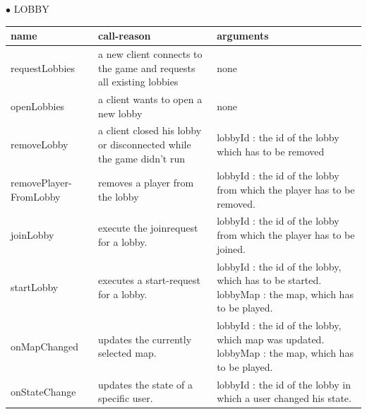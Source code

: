 \documentclass{scrartcl}
\newcommand{\n}{\newline}
\begin{document}
\newpage
$\bullet$ LOBBY
\begin{center}
    \begin{tabular}{| p{3.1cm} | p{5cm} | p{5.9cm} |}
        \hline
        \textbf{name} & \textbf{call-reason} & \textbf{arguments} \\ \hline
        requestLobbies & a new client connects to the game and requests all existing lobbies & none\\ \hline
        openLobbies & a client wants to open a new lobby & none \\ \hline
        removeLobby & a client closed his lobby or disconnected while the game didn't run & lobbyId : the id of the lobby which has to be removed \\ \hline
        removePlayer-\n FromLobby & removes a player from the lobby & lobbyId : the id of the lobby from which the player has to be removed. \\ \hline
        joinLobby & execute the joinrequest for a lobby. & lobbyId : the id of the lobby from which the player has to be joined. \\ \hline
        startLobby & executes a start-request for a lobby. & lobbyId : the id of the lobby, which has to be started. \n lobbyMap : the map, which has to be played. \\ \hline
        onMapChanged & updates the currently selected map. & lobbyId : the id of the lobby, which map was updated. \n lobbyMap : the map, which has to be played. \\ \hline
        onStateChange & updates the state of a specific user. & lobbyId : the id of the lobby in which a user changed his state. \\ \hline
        
    \end{tabular}
\end{center}
\end{document}
